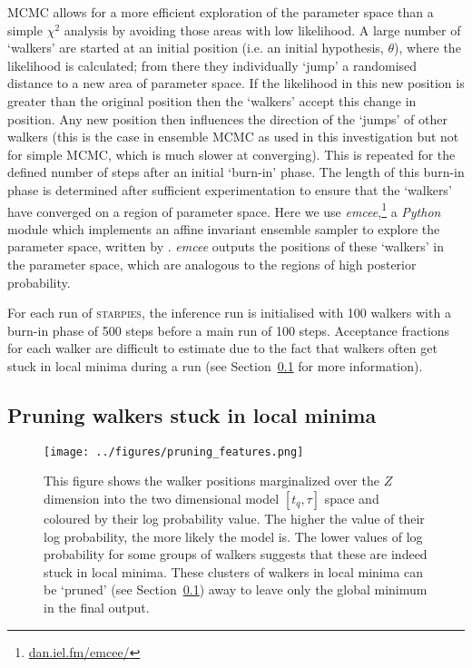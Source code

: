 \documentclass[useAMS,usenatbib]{mn2e}
\begin{document}
MCMC allows for a more efficient exploration of the parameter space than a simple $\chi^2$ analysis by avoiding those areas with low likelihood. A large number of `walkers' are started at an initial position (i.e. an initial hypothesis, $\theta$), where the likelihood is calculated; from there they individually `jump' a randomised distance to a new area of parameter space. If the likelihood in this new position is greater than the original position then the `walkers' accept this change in position. Any new position then influences the direction of the  `jumps' of other walkers (this is the case in ensemble MCMC as used in this investigation but not for simple MCMC, which is much slower at converging). This is repeated for the defined number of steps after an initial `burn-in' phase. The length of this burn-in phase is determined after sufficient experimentation to ensure that the `walkers' have converged on a region of parameter space. Here we use \emph{emcee},\footnote{\url{dan.iel.fm/emcee/}} a \emph{Python} module which implements an affine invariant ensemble sampler to explore the parameter space, written by \cite{emcee13}. \emph{emcee} outputs the positions of these `walkers' in the parameter space, which are analogous to the regions of high posterior probability. 

For each run of \textsc{starpies}, the inference run is initialised with 100 walkers with a burn-in phase of 500 steps before a main run of 100 steps. Acceptance fractions for each walker are difficult to estimate due to the fact that walkers often get stuck in local minima during a run (see Section~\ref{sec:pruning} for more information). 


\subsection{Pruning walkers stuck in local minima}\label{sec:pruning}

\begin{figure}
\centering
\texttt{[image: ../figures/pruning\_features.png]}
\caption{This figure shows the walker positions marginalized over the $Z$ dimension into the two dimensional model $[t_q, \tau]$ space and coloured by their log probability value. The higher the value of their log probability, the more likely the model is. The lower values of log probability for some groups of walkers suggests that these are indeed stuck in local minima. These clusters of walkers in local minima can be `pruned' (see Section~\ref{sec:pruning}) away to leave only the global minimum in the final output.}
\label{fig:localminima}
\end{figure}
\end{document}
